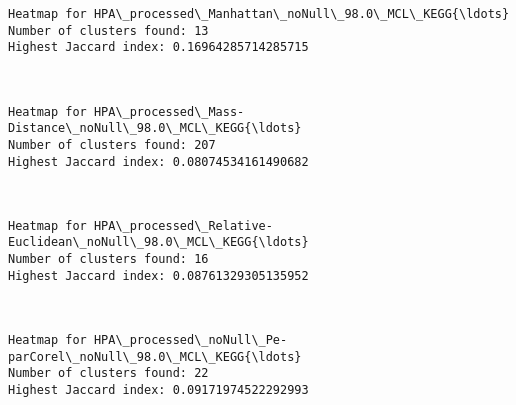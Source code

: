 \documentclass[11pt]{article}
\begin{document}
    \begin{Verbatim}[commandchars=\\\{\}]
Heatmap for HPA\_processed\_Manhattan\_noNull\_98.0\_MCL\_KEGG{\ldots}
Number of clusters found: 13
Highest Jaccard index: 0.16964285714285715

    \end{Verbatim}

    \begin{center}
    \end{center}
    { \hspace*{\fill} \\}
    
    \begin{Verbatim}[commandchars=\\\{\}]
Heatmap for HPA\_processed\_Mass-Distance\_noNull\_98.0\_MCL\_KEGG{\ldots}
Number of clusters found: 207
Highest Jaccard index: 0.08074534161490682

    \end{Verbatim}

    \begin{center}
    \end{center}
    { \hspace*{\fill} \\}
    
    \begin{Verbatim}[commandchars=\\\{\}]
Heatmap for HPA\_processed\_Relative-Euclidean\_noNull\_98.0\_MCL\_KEGG{\ldots}
Number of clusters found: 16
Highest Jaccard index: 0.08761329305135952

    \end{Verbatim}

    \begin{center}
    \end{center}
    { \hspace*{\fill} \\}
    
    \begin{Verbatim}[commandchars=\\\{\}]
Heatmap for HPA\_processed\_noNull\_Pe-parCorel\_noNull\_98.0\_MCL\_KEGG{\ldots}
Number of clusters found: 22
Highest Jaccard index: 0.09171974522292993

    \end{Verbatim}
\end{document}

